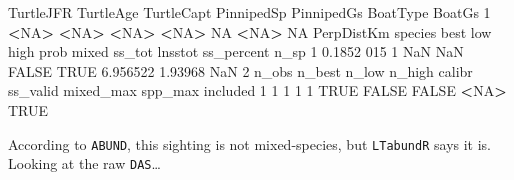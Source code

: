 \documentclass[
]{book}
\newenvironment{Shaded}{\begin{snugshade}}{\end{snugshade}}
\newcommand{\ConstantTok}[1]{\textcolor[rgb]{0.56,0.35,0.01}{#1}}
\newcommand{\DecValTok}[1]{\textcolor[rgb]{0.00,0.00,0.81}{#1}}
\newcommand{\ErrorTok}[1]{\textcolor[rgb]{0.64,0.00,0.00}{\textbf{#1}}}
\newcommand{\FloatTok}[1]{\textcolor[rgb]{0.00,0.00,0.81}{#1}}
\newcommand{\NormalTok}[1]{#1}
\newcommand{\SpecialCharTok}[1]{\textcolor[rgb]{0.81,0.36,0.00}{\textbf{#1}}}
\begin{document}
\begin{Shaded}
\begin{Highlighting}[]
\NormalTok{  TurtleJFR TurtleAge TurtleCapt PinnipedSp PinnipedGs BoatType BoatGs}
\DecValTok{1}      \SpecialCharTok{\textless{}}\ConstantTok{NA}\SpecialCharTok{\textgreater{}}      \ErrorTok{\textless{}}\ConstantTok{NA}\SpecialCharTok{\textgreater{}}       \ErrorTok{\textless{}}\ConstantTok{NA}\SpecialCharTok{\textgreater{}}       \ErrorTok{\textless{}}\ConstantTok{NA}\SpecialCharTok{\textgreater{}}         \ConstantTok{NA}     \SpecialCharTok{\textless{}}\ConstantTok{NA}\SpecialCharTok{\textgreater{}}     \ConstantTok{NA}
\NormalTok{  PerpDistKm species best low high  prob mixed   ss\_tot lnsstot ss\_percent n\_sp}
\DecValTok{1}     \FloatTok{0.1852}     \DecValTok{015}    \DecValTok{1} \ConstantTok{NaN}  \ConstantTok{NaN} \ConstantTok{FALSE}  \ConstantTok{TRUE} \FloatTok{6.956522} \FloatTok{1.93968}        \ConstantTok{NaN}    \DecValTok{2}
\NormalTok{  n\_obs n\_best n\_low n\_high calibr ss\_valid mixed\_max spp\_max included}
\DecValTok{1}     \DecValTok{1}      \DecValTok{1}     \DecValTok{1}      \DecValTok{1}   \ConstantTok{TRUE}    \ConstantTok{FALSE}     \ConstantTok{FALSE}    \SpecialCharTok{\textless{}}\ConstantTok{NA}\SpecialCharTok{\textgreater{}}     \ConstantTok{TRUE}
\end{Highlighting}
\end{Shaded}

According to \texttt{ABUND}, this sighting is not mixed-species, but \texttt{LTabundR} says it is. Looking at the raw \texttt{DAS}\ldots{}
\end{document}
